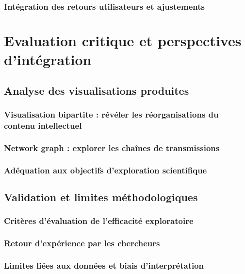 \documentclass[a4paper,12pt,twoside]{book}
\newcommand{\clearemptydoublepage}{\newpage{\pagestyle{empty}\cleardoublepage}}
\begin{document}
	\section{Intégration des retours utilisateurs et ajustements}
	
	
	\clearemptydoublepage
	
	\part{Evaluation critique et perspectives d'intégration}
	\chapter{Analyse des visualisations produites}
	\section{Visualisation bipartite : révéler les réorganisations du contenu intellectuel}
	
	
	\section{Network graph : explorer les chaînes de transmissions}
	
	
	\section{Adéquation aux objectifs d'exploration scientifique}
	
	
	\clearemptydoublepage
	
	\chapter{Validation et limites méthodologiques}
	\section{Critères d'évaluation de l'efficacité exploratoire}
	
	
	\section{Retour d'expérience par les chercheurs}
	
	
	\section{Limites liées aux données et biais d'interprétation}
	
	
\end{document}
